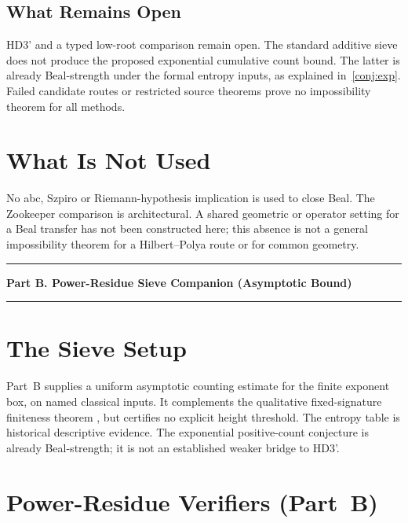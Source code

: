 \documentclass[11pt,a4paper]{article}
\begin{document}
\subsection*{What Remains Open}
HD3' and a typed low-root comparison remain open. The standard additive
sieve does not produce the proposed exponential cumulative count bound.
The latter is already Beal-strength under the formal entropy inputs,
as explained in~\cref{conj:exp}. Failed candidate routes or restricted
source theorems prove no impossibility theorem for all methods.

\section{What Is Not Used}

No abc, Szpiro or Riemann-hypothesis implication is used to close Beal.
The Zookeeper comparison is architectural. A shared geometric or
operator setting for a Beal transfer has not been constructed here;
this absence is not a general impossibility theorem for a
Hilbert--Polya route or for common geometry.

\bigskip\hrule\medskip
\begin{center}
\textbf{Part B. Power-Residue Sieve Companion (Asymptotic Bound)}
\end{center}
\medskip\hrule\bigskip

\section{The Sieve Setup}
\label{sec:weilinput}

Part~B supplies a uniform asymptotic counting estimate for the finite
exponent box, on named classical inputs. It complements the
qualitative fixed-signature finiteness theorem
\cite{DarmonGranville1995}, but certifies no explicit height threshold.
The entropy table is historical descriptive evidence.
The exponential positive-count conjecture is already Beal-strength;
it is not an established weaker bridge to HD3'.

\section{Power-Residue Verifiers (Part~B)}

\end{document}
